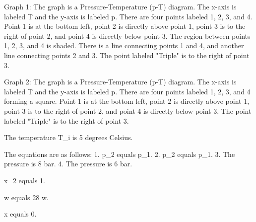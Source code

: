 Graph 1: The graph is a Pressure-Temperature (p-T) diagram. The x-axis is labeled T and the y-axis is labeled p. There are four points labeled 1, 2, 3, and 4. Point 1 is at the bottom left, point 2 is directly above point 1, point 3 is to the right of point 2, and point 4 is directly below point 3. The region between points 1, 2, 3, and 4 is shaded. There is a line connecting points 1 and 4, and another line connecting points 2 and 3. The point labeled "Triple" is to the right of point 3.

Graph 2: The graph is a Pressure-Temperature (p-T) diagram. The x-axis is labeled T and the y-axis is labeled p. There are four points labeled 1, 2, 3, and 4 forming a square. Point 1 is at the bottom left, point 2 is directly above point 1, point 3 is to the right of point 2, and point 4 is directly below point 3. The point labeled "Triple" is to the right of point 3.

The temperature T_i is 5 degrees Celsius.

The equations are as follows:
1. p_2 equals p_1.
2. p_2 equals p_1.
3. The pressure is 8 bar.
4. The pressure is 6 bar.

x_2 equals 1.

w equals 28 w.

x equals 0.
